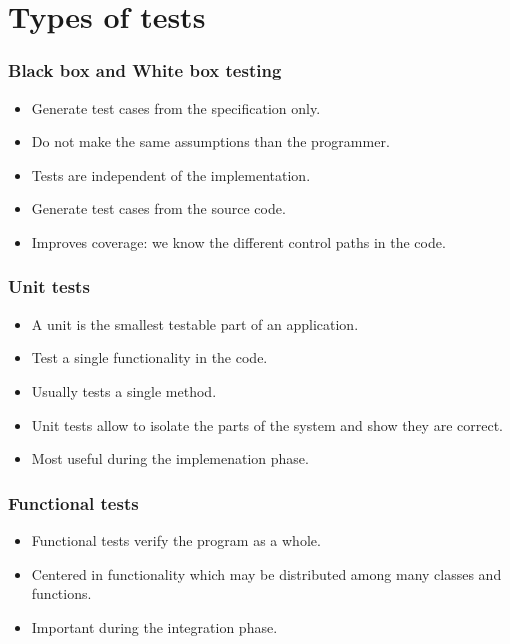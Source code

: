 \documentclass[10pt]{beamer}
\begin{document}
\section{Types of tests}
\begin{frame}[fragile]
  \frametitle{Black box and White box testing}
  \begin{itemize}
  \item Generate test cases from the specification only.
  \item Do not make the same assumptions than the programmer.
  \item Tests are independent of the implementation.
  \end{itemize}

  \begin{itemize}
    \item Generate test cases from the source code.
    \item Improves coverage: we know the different control paths in the code.
  \end{itemize}
\end{frame}

\begin{frame}[fragile]
  \frametitle{Unit tests}
  \begin{itemize}
  \item A unit is the smallest testable part of an application.
  \item Test a single functionality in the code.
  \item Usually tests a single method.
  \item Unit tests allow to isolate the parts of the system and show they are
    correct.
  \item Most useful during the implemenation phase.
  \end{itemize}
\end{frame}

\begin{frame}[fragile]
  \frametitle{Functional tests}
  \begin{itemize}
    \item Functional tests verify the program as a whole.
    \item Centered in functionality which may be distributed among many classes
      and functions.
    \item Important during the integration phase.
  \end{itemize}
\end{frame}
\end{document}
